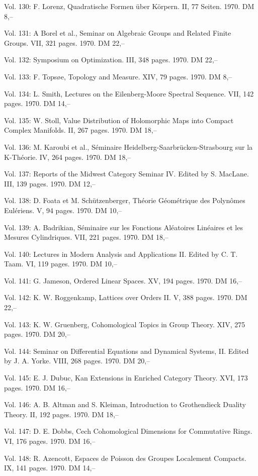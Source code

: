 Vol. 130: F. Lorenz, Quadratische Formen über Körpern. II, 77 Seiten. 1970. DM 8,--

Vol. 131: A Borel et al., Seminar on Algebraic Groups and Related Finite Groups. VII, 321 pages. 1970. DM 22,--

Vol. 132: Symposium on Optimization. III, 348 pages. 1970. DM 22,--

Vol. 133: F. Topsøe, Topology and Measure. XIV, 79 pages. 1970. DM 8,--

Vol. 134: L. Smith, Lectures on the Eilenberg-Moore Spectral Sequence. VII, 142 pages. 1970. DM 14,--

Vol. 135: W. Stoll, Value Distribution of Holomorphic Maps into Compact Complex Manifolds. II, 267 pages. 1970. DM 18,--

Vol. 136: M. Karoubi et al., Séminaire Heidelberg-Saarbrücken-Strasbourg sur la K-Théorie. IV, 264 pages. 1970. DM 18,--

Vol. 137: Reports of the Midwest Category Seminar IV. Edited by S. MacLane. III, 139 pages. 1970. DM 12,--

Vol. 138: D. Foata et M. Schützenberger, Théorie Géométrique des Polynômes Eulériens. V, 94 pages. 1970. DM 10,--

Vol. 139: A. Badrikian, Séminaire sur les Fonctions Aléatoires Linéaires et les Mesures Cylindriques. VII, 221 pages. 1970. DM 18,--

Vol. 140: Lectures in Modern Analysis and Applications II. Edited by C. T. Taam. VI, 119 pages. 1970. DM 10,--

Vol. 141: G. Jameson, Ordered Linear Spaces. XV, 194 pages. 1970. DM 16,--

Vol. 142: K. W. Roggenkamp, Lattices over Orders II. V, 388 pages. 1970. DM 22,--

Vol. 143: K. W. Gruenberg, Cohomological Topics in Group Theory. XIV, 275 pages. 1970. DM 20,--

Vol. 144: Seminar on Differential Equations and Dynamical Systems, II. Edited by J. A. Yorke. VIII, 268 pages. 1970. DM 20,--

Vol. 145: E. J. Dubuc, Kan Extensions in Enriched Category Theory. XVI, 173 pages. 1970. DM 16,--

Vol. 146: A. B. Altman and S. Kleiman, Introduction to Grothendieck Duality Theory. II, 192 pages. 1970. DM 18,--

Vol. 147: D. E. Dobbs, Cech Cohomological Dimensions for Commutative Rings. VI, 176 pages. 1970. DM 16,--

Vol. 148: R. Azencott, Espaces de Poisson des Groupes Localement Compacts. IX, 141 pages. 1970. DM 14,--

